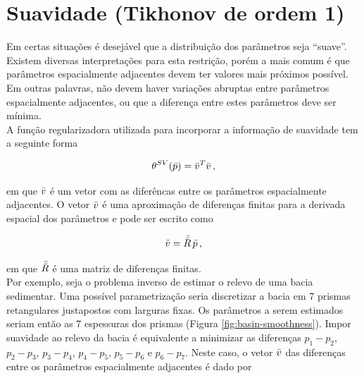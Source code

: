 \section{Suavidade (Tikhonov de ordem 1)}
\label{sec:smoothness}

Em certas situações é desejável que a distribuição dos parâmetros seja ``suave''.
Existem diversas interpretações para esta restrição, porém a mais comum é que
parâmetros espacialmente adjacentes devem ter valores mais próximos possível.
Em outras palavras, não devem haver variações abruptas entre parâmetros
espacialmente adjacentes, ou que a diferença entre estes parâmetros deve ser
mínima.
\\
\indent A função regularizadora utilizada para incorporar a informação de
suavidade tem a seguinte forma

\begin{equation}
\theta^{SV}(\bar{p}) = \bar{v}^T\bar{v} \thinspace ,
\end{equation}

\noindent em que $\bar{v}$ é um vetor com as diferêncas entre os parâmetros
espacialmente adjacentes. O vetor $\bar{v}$ é uma aproximação de diferenças
finitas para a derivada espacial dos parâmetros e pode ser escrito como

\begin{equation}
\bar{v} = \bar{\bar{R}}\thinspace\bar{p} \thinspace ,
\label{eq:vetor_diferencas}
\end{equation}

\noindent em que $\bar{\bar{R}}$ é uma matriz de diferenças finitas.
\\
\indent Por exemplo, seja o problema inverso de estimar o relevo de uma bacia
sedimentar. Uma possível parametrização seria discretizar a bacia em 7 prismas
retangulares justapostos com larguras fixas. Os parâmetros a serem estimados
seriam então as 7 espessuras dos prismas (Figura \ref{fig:basin-smoothness}).
Impor suavidade ao relevo da bacia é equivalente a minimizar as diferenças
$p_1 - p_2$, $p_2 - p_3$, $p_3 - p_4$, $p_4 - p_5$, $p_5 - p_6$ e $p_6 - p_7$.
Neste caso, o vetor $\bar{v}$ das diferenças entre os parâmetros espacialmente
adjacentes é dado por

